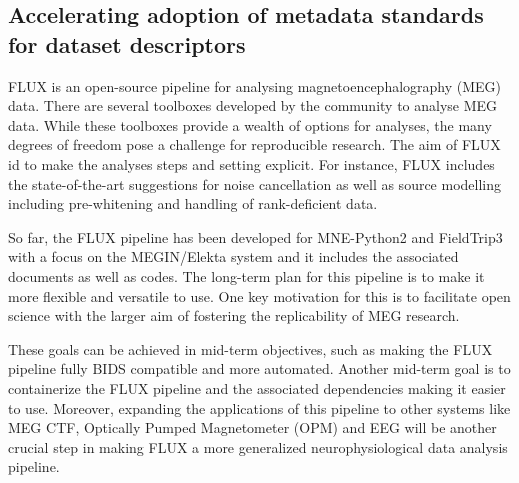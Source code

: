 \documentclass[../main.tex]{subfiles}
\begin{document}
\subsection{Accelerating adoption of metadata standards for dataset descriptors}

%

FLUX \parencite{} is an open-source pipeline for analysing magnetoencephalography (MEG) data. There are several toolboxes developed by the community to analyse MEG data. While these toolboxes provide a wealth of options for analyses, the many degrees of freedom pose a challenge for reproducible research. The aim of FLUX id to make the analyses steps and setting explicit. For instance, FLUX includes the state-of-the-art suggestions for noise cancellation as well as source modelling including pre-whitening and handling of rank-deficient data.

So far, the FLUX pipeline has been developed for MNE-Python2 \parencite{} and FieldTrip3 \parencite{} with a focus on the MEGIN/Elekta system and it includes the associated documents as well as codes.
The long-term plan for this pipeline is to make it more flexible and versatile to use. One key motivation for this is to facilitate open science with the larger aim of fostering the replicability of MEG research.

These goals can be achieved in mid-term objectives, such as making the FLUX pipeline fully BIDS compatible and more automated. Another mid-term goal is to containerize the FLUX pipeline and the associated dependencies making it easier to use. Moreover, expanding the applications of this pipeline to other systems like MEG CTF, Optically Pumped Magnetometer (OPM) and EEG will be another crucial step in making FLUX a more generalized neurophysiological data analysis pipeline.
\end{document}
